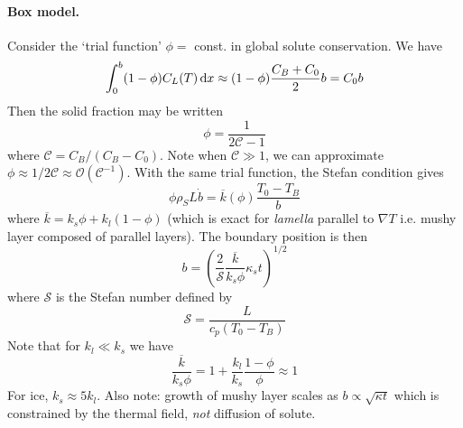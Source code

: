 \documentclass{jknotes}
\newcommand{\C}{\mathcal{C}}
\renewcommand{\S}{\mathcal{S}}
\begin{document}
\paragraph{Box model.}
Consider the `trial function' $\phi =$ const. in global solute conservation.
We have
\begin{equation}
	\int_0^b (1-\phi)C_L(T)\,\diffd x \approx (1-\phi) \frac{C_B + C_0}{2} b =
	C_0 b
\end{equation}
Then the solid fraction may be written
\begin{equation}
	\phi = \frac{1}{2\C -1}
\end{equation}
where $\C = C_B/(C_B-C_0)$. Note when $\C \gg 1$, we can approximate $\phi
\approx 1/2\C \approx \mathcal{O}(\C^{-1})$. With the same trial function, the
Stefan condition gives
\begin{equation}
	\phi \rho_S L \dot{b} = \overline{k}(\phi) \frac{T_0 - T_B}{b}
\end{equation}
where $\overline{k} = k_s \phi + k_l (1-\phi)$ (which is exact for 
\emph{lamella} parallel to $\nabla T$ i.e. mushy layer composed of parallel
layers). The boundary position is then
\begin{equation}
	b = \left( \frac{2}{\S} \frac{\overline{k}}{k_s \phi} \kappa_s
	t\right)^{1/2}
\end{equation}
where $\S$ is the Stefan number defined by
\begin{equation}
	\S = \frac{L}{c_p(T_0-T_B)}
\end{equation}
Note that for $k_l \ll k_s$ we have
\begin{equation}
	\frac{\overline{k}}{k_s \phi} = 1+ \frac{k_l}{k_s} \frac{1-\phi}{\phi}
	\approx 1
\end{equation}
For ice, $k_s \approx 5 k_l$. Also note: growth of mushy layer scales as $b
\propto \sqrt{\kappa t}$ which is constrained by the thermal field, \emph{not}
diffusion of solute.
\end{document}
